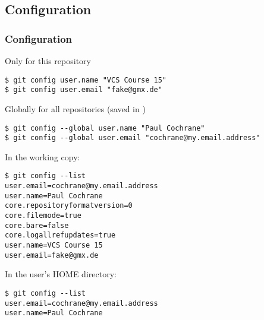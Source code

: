 \subsection{Configuration}
\begin{frame}[fragile]
\frametitle{Configuration}
\vspace*{-3mm}

Only for this repository
\begin{lstlisting}[basicstyle=\tiny\ttfamily\color{black}]
$ git config user.name "VCS Course 15"
$ git config user.email "fake@gmx.de"
\end{lstlisting}

Globally for all repositories (saved in )
\begin{lstlisting}[basicstyle=\tiny\ttfamily\color{black}]
$ git config --global user.name "Paul Cochrane"
$ git config --global user.email "cochrane@my.email.address"
\end{lstlisting}

\vspace*{-2mm}
\begin{multicols}{2}
In the  working copy:
\begin{lstlisting}[basicstyle=\tiny\ttfamily\color{black}]
$ git config --list
user.email=cochrane@my.email.address
user.name=Paul Cochrane
core.repositoryformatversion=0
core.filemode=true
core.bare=false
core.logallrefupdates=true
user.name=VCS Course 15
user.email=fake@gmx.de
\end{lstlisting}
\columnbreak
In the user's HOME directory:
\begin{lstlisting}[basicstyle=\tiny\ttfamily\color{black}]
$ git config --list
user.email=cochrane@my.email.address
user.name=Paul Cochrane
\end{lstlisting}
\end{multicols}

\end{frame}

